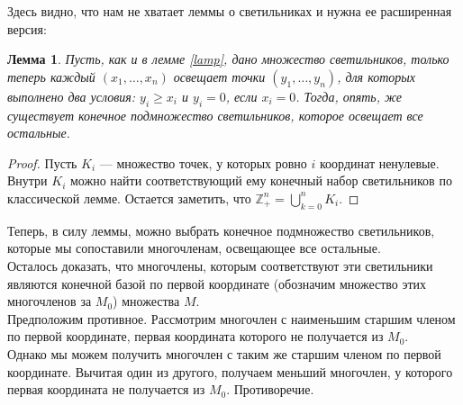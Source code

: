 \documentclass[12pt,a4paper]{article}
\newtheorem{lemma}{Лемма}[section]
\begin{document}
    Здесь видно, что нам не хватает леммы о светильниках и нужна ее расширенная версия:\vskip 0.1in\noindent
    \begin{lemma}
        Пусть, как и в лемме \ref{lamp}, дано множество светильников, только теперь каждый $(x_1,\ldots,x_n)$ освещает точки $(y_1,\ldots,y_n)$, для которых выполнено два условия: $y_i\geq x_i$ и $y_i=0$, если $x_i=0$. Тогда, опять, же существует конечное подмножество светильников, которое освещает все остальные.
    \end{lemma}
    \begin{proof}
        Пусть $K_i$ --- множество точек, у которых ровно $i$ координат ненулевые. Внутри $K_i$ можно найти соответствующий ему конечный набор светильников по классической лемме. Остается заметить, что $\mathbb{Z}_+^n=\bigcup_{k=0}^n K_i$.
    \end{proof}
    Теперь, в силу леммы, можно выбрать конечное подмножество светильников, которые мы сопоставили многочленам, освещающее все остальные.\\
    Осталось доказать, что многочлены, которым соответствуют эти светильники являются конечной базой по первой координате (обозначим множество этих многочленов за $M_0$) множества $M$. \\
    Предположим противное. Рассмотрим многочлен с наименьшим старшим членом по первой координате, первая координата которого не получается из $M_0$.\\
    Однако мы можем получить многочлен с таким же старшим членом по первой координате. Вычитая один из другого, получаем меньший многочлен, у которого первая координата не получается из $M_0$. Противоречие.
\end{document}

